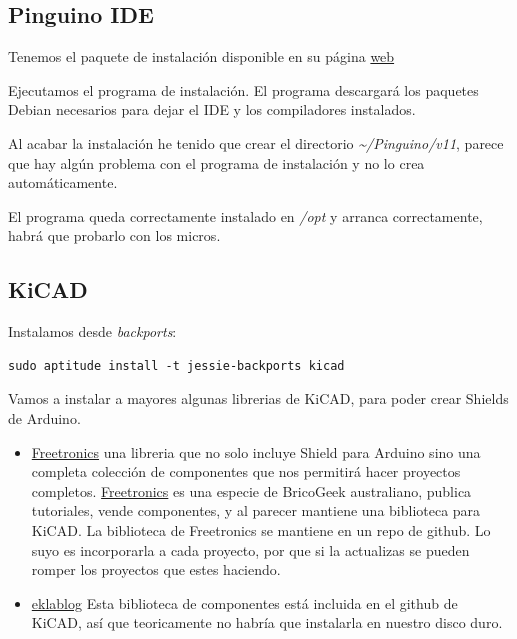 \documentclass[12pt,spanish,]{scrartcl}
\providecommand{\tightlist}{%
  \setlength{\itemsep}{0pt}\setlength{\parskip}{0pt}}
\begin{document}
\hypertarget{pinguino-ide}{%
\subsection{Pinguino IDE}\label{pinguino-ide}}

Tenemos el paquete de instalación disponible en su página
\href{http://pinguino.cc/download.php}{web}

Ejecutamos el programa de instalación. El programa descargará los
paquetes Debian necesarios para dejar el IDE y los compiladores
instalados.

Al acabar la instalación he tenido que crear el directorio
\emph{\textasciitilde{}/Pinguino/v11}, parece que hay algún problema con
el programa de instalación y no lo crea automáticamente.

El programa queda correctamente instalado en \emph{/opt} y arranca
correctamente, habrá que probarlo con los micros.

\hypertarget{kicad}{%
\subsection{KiCAD}\label{kicad}}

Instalamos desde \emph{backports}:

\begin{verbatim}
sudo aptitude install -t jessie-backports kicad
\end{verbatim}

Vamos a instalar a mayores algunas librerias de KiCAD, para poder crear
Shields de Arduino.

\begin{itemize}
\tightlist
\item
  \href{https://github.com/freetronics/freetronics_kicad_library}{Freetronics}
  una libreria que no solo incluye Shield para Arduino sino una completa
  colección de componentes que nos permitirá hacer proyectos completos.
  \href{http://www.freetronics.com}{Freetronics} es una especie de
  BricoGeek australiano, publica tutoriales, vende componentes, y al
  parecer mantiene una biblioteca para KiCAD. La biblioteca de
  Freetronics se mantiene en un repo de github. Lo suyo es incorporarla
  a cada proyecto, por que si la actualizas se pueden romper los
  proyectos que estes haciendo.
\item
  \href{http://meta-blog.eklablog.com/kicad-librairie-arduino-pretty-p930786}{eklablog}
  Esta biblioteca de componentes está incluida en el github de KiCAD,
  así que teoricamente no habría que instalarla en nuestro disco duro.
\end{itemize}
\end{document}
